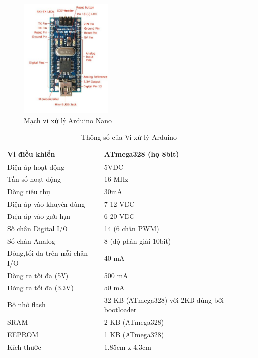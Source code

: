 \begin{figure}[H]
\centering    
\includegraphics[width=0.4\textwidth]{arduinonano}
\caption[Mạch vi xử lý Arduino Nano]{Mạch vi xử lý Arduino Nano}
\label{fig:arduinonano}
\end{figure}

\begin{center}
\begin{table}[]
\centering
\caption{Thông số của Vi xử lý Arduino}
\label{table:thongsoarduino}
\begin{tabular}{|l|l|}
\hline
Vi điều khiển                 & ATmega328 (họ 8bit)                           \\ \hline
Điện áp hoạt động             & 5VDC                                          \\ \hline
Tần số hoạt động              & 16 MHz                                        \\ \hline
Dòng tiêu thụ                 & 30mA                                          \\ \hline
Điện áp vào khuyên dùng       & 7-12 VDC                                      \\ \hline
Điện áp vào giới hạn          & 6-20 VDC                                      \\ \hline
Số chân Digital I/O           & 14 (6 chân PWM)                               \\ \hline
Số chân Analog                & 8 (độ phân giải 10bit)                        \\ \hline
Dòng,tối đa trên mỗi chân I/O & 40 mA                                         \\ \hline
Dòng ra tối đa (5V)           & 500 mA                                        \\ \hline
Dòng ra tối đa (3.3V)         & 50 mA                                         \\ \hline
Bộ nhớ flash                  & 32 KB (ATmega328) với 2KB dùng bởi bootloader \\ \hline
SRAM                          & 2 KB (ATmega328)                              \\ \hline
EEPROM                        & 1 KB (ATmega328)                              \\ \hline
Kích thước                    & 1.85cm x 4.3cm                                \\ \hline
\end{tabular}
\end{table}
\end{center}


